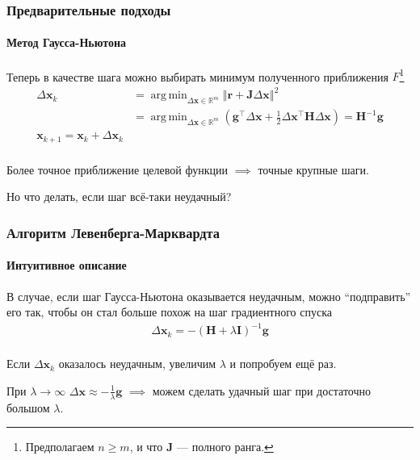 \documentclass[notheorems,aspectratio=169]{beamer}
\DeclareMathOperator*{\argmin}{arg\,min}
\begin{document}
\begin{frame}
  \frametitle{Предварительные подходы}
  \framesubtitle{Метод Гаусса-Ньютона}
  Теперь в качестве шага можно выбирать минимум полученного приближения $F$\footnote[frame]{Предполагаем $n\geq m$, и что $\mathbf{J}$ --- полного ранга.}
  \begin{align*}
    \Delta\mathbf{x}_k & =\argmin_{\Delta\mathbf{x}\in \mathbb{R}^m}\left\Vert\mathbf{r}+\mathbf{J}\Delta\mathbf{x}\right\Vert^2 \\
                       & =\argmin_{\Delta\mathbf{x}\in \mathbb{R}^m}\left(\mathbf{g}^\intercal\Delta\mathbf{x}+\frac{1}{2}\Delta\mathbf{x}^\intercal\mathbf{H}\Delta\mathbf{x}\right)=\mathbf{H}^{-1}\mathbf{g} \\
      \mathbf{x}_{k+1}=\mathbf{x}_k+\Delta\mathbf{x}_k \\
  \end{align*}

    Более точное приближение целевой функции $\implies$ точные крупные шаги.

    Но что делать, если шаг всё-таки неудачный?
\end{frame}

\begin{frame}
  \frametitle{Алгоритм Левенберга-Марквардта}
  \framesubtitle{Интуитивное описание}
  В случае, если шаг Гаусса-Ньютона оказывается неудачным, можно ``подправить'' его так, чтобы он стал больше похож на шаг градиентного спуска
  \begin{equation*}
    \begin{gathered}
      \Delta\mathbf{x}_k=-\left(\mathbf{H}+\lambda\mathbf{I}\right)^{-1}\mathbf{g} \\
    \end{gathered}
  \end{equation*}

  Если $\Delta\mathbf{x}_k$ оказалось неудачным, увеличим $\lambda$ и попробуем ещё раз.
  
  При $\lambda\rightarrow\infty$ $\Delta\mathbf{x}\approx -\frac{1}{\lambda}\mathbf{g}$ $\implies$ можем сделать удачный шаг при достаточно большом $\lambda$.

\end{frame}
\end{document}
